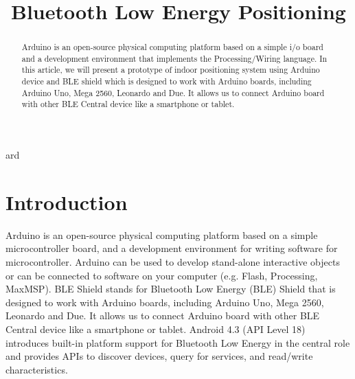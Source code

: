 \documentclass[conference,a4paper]{../../sty/IEEEtran}
\begin{document}
%
\title{Bluetooth Low Energy Positioning}


\author{
}


\maketitle


\begin{abstract}

Arduino is an open-source physical computing platform based on a simple i/o board and a development environment that implements the Processing/Wiring language. In this article, we will present a prototype of indoor positioning system using Arduino device and BLE shield which is designed to work with Arduino boards, including Arduino Uno, Mega 2560, Leonardo and Due. It allows us to connect Arduino board with other BLE Central device like a smartphone or tablet. 

\end{abstract}




ard\section{Introduction}
Arduino is an open-source physical computing platform based on a simple microcontroller board, and a development environment for writing software for microcontroller. Arduino can be used to develop stand-alone interactive objects or can be connected to software on your computer (e.g. Flash, Processing, MaxMSP). BLE Shield stands for Bluetooth Low Energy (BLE) Shield \cite{ble} that is designed to work with Arduino boards, including Arduino Uno, Mega 2560, Leonardo and Due. It allows us to connect Arduino board with other BLE Central device like a smartphone or tablet. Android 4.3 (API Level 18) introduces built-in platform support for Bluetooth Low Energy in the central role and provides APIs to discover devices, query for services, and read/write characteristics.
\end{document}
